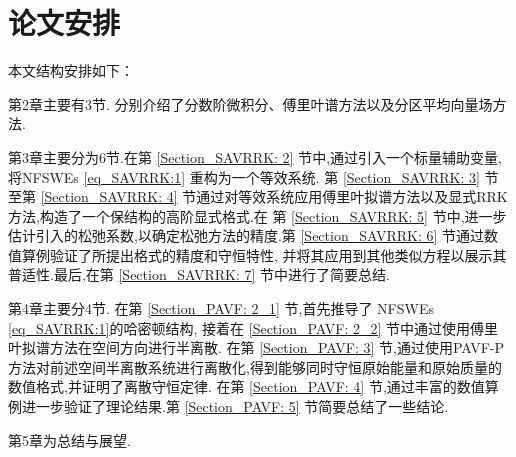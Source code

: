 
\section{论文安排}
本文结构安排如下：

第2章主要有3节. 分别介绍了分数阶微积分、傅里叶谱方法以及分区平均向量场方法.

第3章主要分为6节.在第 \ref{Section_SAVRRK: 2} 节中,通过引入一个标量辅助变量,将NFSWEs \eqref{eq_SAVRRK:1} 重构为一个等效系统.
第 \ref{Section_SAVRRK: 3} 节至第 \ref{Section_SAVRRK: 4} 节通过对等效系统应用傅里叶拟谱方法以及显式RRK方法,构造了一个保结构的高阶显式格式.在
第 \ref{Section_SAVRRK: 5} 节中,进一步估计引入的松弛系数,以确定松弛方法的精度.第 \ref{Section_SAVRRK: 6} 节通过数值算例验证了所提出格式的精度和守恒特性,
并将其应用到其他类似方程以展示其普适性.最后,在第 \ref{Section_SAVRRK: 7} 节中进行了简要总结.

第4章主要分4节. 在第 \ref{Section_PAVF: 2_1} 节,首先推导了 NFSWEs \eqref{eq_SAVRRK:1}的哈密顿结构, 接着在 \ref{Section_PAVF: 2_2} 节中通过使用傅里叶拟谱方法在空间方向进行半离散.
在第 \ref{Section_PAVF: 3} 节,通过使用PAVF-P方法对前述空间半离散系统进行离散化,得到能够同时守恒原始能量和原始质量的数值格式,并证明了离散守恒定律.
在第 \ref{Section_PAVF: 4} 节,通过丰富的数值算例进一步验证了理论结果.第 \ref{Section_PAVF: 5} 节简要总结了一些结论.

第5章为总结与展望.